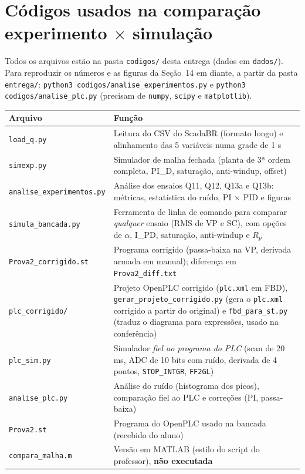 \appendix
\section{Códigos usados na comparação experimento $\times$ simulação}\label{apcodigos}
Todos os arquivos estão na pasta \texttt{codigos/} desta entrega (dados em \texttt{dados/}). Para reproduzir os números e as figuras da Seção~14 em diante, a partir da pasta \texttt{entrega/}: \texttt{python3 codigos/analise\_experimentos.py} e \texttt{python3 codigos/analise\_plc.py} (precisam de \texttt{numpy}, \texttt{scipy} e \texttt{matplotlib}).
\begin{center}\small\begin{tabular}{lp{10.5cm}}\toprule Arquivo & Função\\\midrule
\texttt{load\_q.py} & Leitura do CSV do ScadaBR (formato longo) e alinhamento das 5 variáveis numa grade de 1 s\\
\texttt{simexp.py} & Simulador de malha fechada (planta de 3ª ordem completa, PI\_D, saturação, anti-windup, offset)\\
\texttt{analise\_experimentos.py} & Análise dos ensaios Q11, Q12, Q13a e Q13b: métricas, estatística do ruído, PI $\times$ PID e figuras\\
\texttt{simula\_bancada.py} & Ferramenta de linha de comando para comparar \emph{qualquer} ensaio (RMS de VP e SC), com opções de $\alpha$, I\_PD, saturação, anti-windup e $R_p$\\
\texttt{Prova2\_corrigido.st} & Programa corrigido (passa-baixa na VP, derivada armada em manual); diferença em \texttt{Prova2\_diff.txt}\\
\texttt{plc\_corrigido/} & Projeto OpenPLC corrigido (\texttt{plc.xml} em FBD), \texttt{gerar\_projeto\_corrigido.py} (gera o \texttt{plc.xml} corrigido a partir do original) e \texttt{fbd\_para\_st.py} (traduz o diagrama para expressões, usado na conferência)\\
\texttt{plc\_sim.py} & Simulador \emph{fiel ao programa do PLC} (scan de 20 ms, ADC de 10 bits com ruído, derivada de 4 pontos, \texttt{STOP\_INTGR}, \texttt{FF2GL})\\
\texttt{analise\_plc.py} & Análise do ruído (histograma dos picos), comparação fiel ao PLC e correções (PI, passa-baixa)\\
\texttt{Prova2.st} & Programa do OpenPLC usado na bancada (recebido do aluno)\\
\texttt{compara\_malha.m} & Versão em MATLAB (estilo do script do professor), \textbf{não executada}\\\bottomrule\end{tabular}\end{center}

